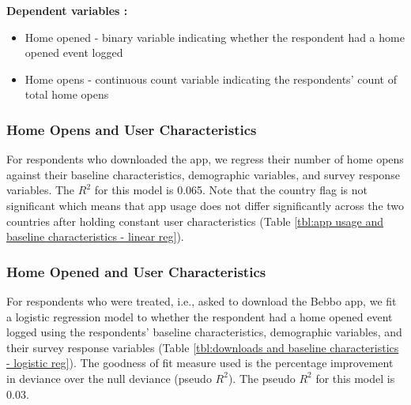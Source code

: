 \message{ !name(bebbo.tex)}\documentclass{article}
\begin{document}
\textbf{Dependent variables :}
\begin{itemize}
    \item Home opened - binary variable indicating whether the respondent had a home opened event logged
    \item Home opens - continuous count variable indicating the respondents' count of total home opens
\end{itemize}


\subsubsection*{Home Opens and User Characteristics}
For respondents who downloaded the app, we regress their number of home opens against their baseline characteristics, demographic variables, and survey response variables. The $R^{2}$ for this model is 0.065. Note that the country flag is not significant which means that app usage does not differ significantly across the two countries after holding constant user characteristics (Table \ref{tbl:app usage and baseline characteristics - linear reg}).


\subsubsection*{Home Opened and User Characteristics}
For respondents who were treated, i.e., asked to download the Bebbo app, we fit a logistic regression model to whether the respondent had a home opened event logged using the respondents' baseline characteristics, demographic variables, and their survey response variables (Table \ref{tbl:downloads and baseline characteristics - logistic reg}). The goodness of fit measure used is the percentage improvement in deviance over the null deviance (pseudo $R^{2}$). The pseudo $R^{2}$ for this model is 0.03.



\printbibliography





\end{document}
